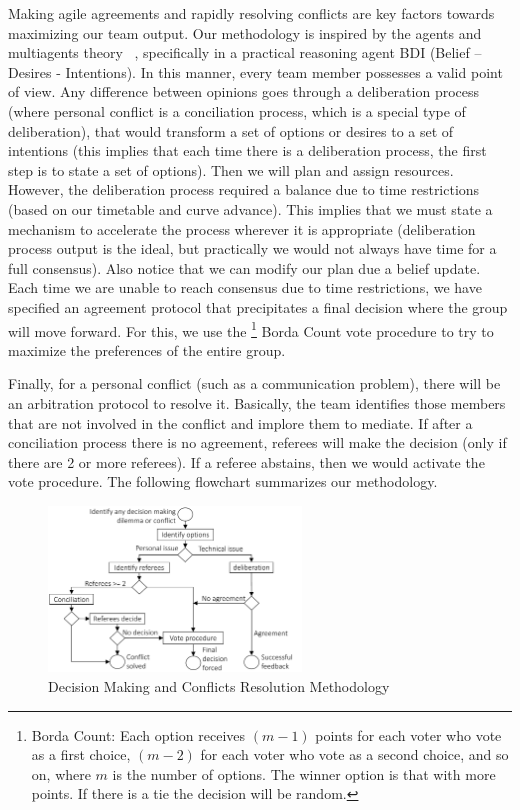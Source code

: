 Making agile agreements and rapidly resolving conflicts are key factors towards maximizing our team output. Our methodology is inspired by the agents and multiagents theory ~\cite{BDI}, specifically in a practical reasoning agent BDI (Belief – Desires - Intentions).  In this manner, every team member possesses a valid point of view. Any difference between opinions goes through a deliberation process (where personal conflict is a conciliation process, which is a special type of deliberation), that would transform a set of options or desires to a set of intentions (this implies that each time there is a deliberation process, the first step is to state a set of options). Then we will plan and assign resources. However, the deliberation process required a balance due to time restrictions (based on our timetable and curve advance). This implies that we must state a mechanism to accelerate the process wherever it is appropriate (deliberation process output is the ideal, but practically we would not always have time for a full consensus). Also notice that we can modify our plan due a belief update. 
Each time we are unable to reach consensus due to time restrictions, we have specified an agreement protocol that precipitates a final decision where the group will move forward. For this, we use the \footnote{Borda Count: Each option receives $(m-1)$ points for each voter who vote as a first choice, $(m-2)$ for each voter who vote as a second choice, and so on, where $m$ is the number of options.  The winner option is that with more points. If there is a tie the decision will be random.} Borda Count vote procedure to try to maximize the preferences of the entire group.


Finally, for a personal conflict (such as a communication problem), there will be an arbitration protocol to resolve it. Basically, the team identifies those members that are not involved in the conflict and implore them to mediate. If after a conciliation process there is no agreement, referees will make the decision (only if there are 2 or more referees). If a referee abstains, then we would activate the vote procedure. The following flowchart summarizes our methodology.




\begin{figure}[ht]
\centering
\includegraphics[width=0.6\textwidth]{figs/met}
	\caption{Decision Making and Conflicts Resolution Methodology}
	\label{fig:decisions}
\end{figure}



